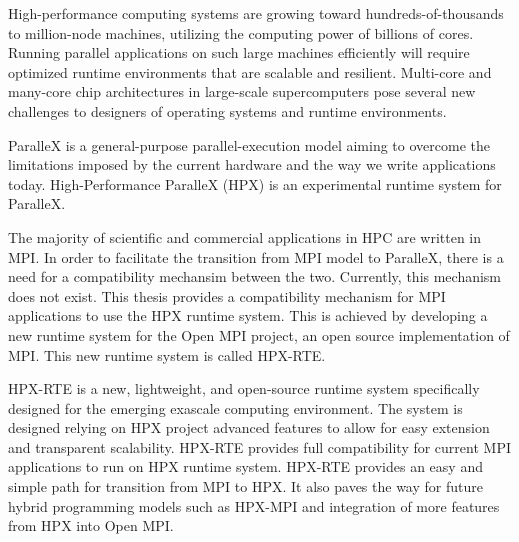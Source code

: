 High-performance computing systems are growing toward hundreds-of-thousands to million-node machines, utilizing the computing power of billions of cores. Running parallel applications on such large machines efficiently will require optimized runtime environments that are scalable and resilient. Multi-core and many-core chip architectures in large-scale supercomputers pose several new challenges to designers of operating systems and runtime environments.

ParalleX is a general-purpose parallel-execution model aiming to overcome the limitations imposed by the current hardware and the way we write applications today. High-Performance ParalleX (HPX) is an experimental runtime system for ParalleX.

The majority of scientific and commercial applications in HPC are written in MPI. In order to facilitate the transition from MPI model to ParalleX, there is a need for a compatibility mechansim between the two. Currently, this mechanism does not exist. This thesis provides a compatibility mechanism for MPI applications to use the HPX runtime system. This is achieved by developing a new runtime system for the Open MPI project, an open source implementation of MPI. This new runtime system is called HPX-RTE.

HPX-RTE is a new, lightweight, and open-source runtime system specifically designed for the emerging exascale computing environment. The system is designed relying on HPX project advanced features to allow for easy extension and transparent scalability. HPX-RTE provides full compatibility for current MPI applications to run on HPX runtime system. HPX-RTE provides an easy and simple path for transition from MPI to HPX. It also paves the way for future hybrid programming models such as HPX-MPI and integration of more features from HPX into Open MPI.
